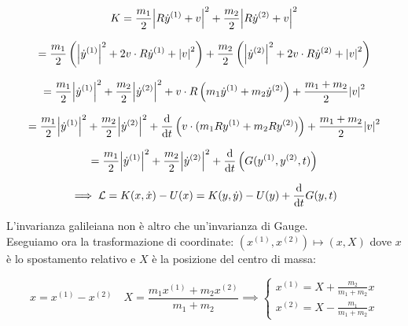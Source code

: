 \begin{equation*}
    K = \frac{m_1}{2}\abs{R\dot{y}^{(1)}+v}^2+\frac{m_2}{2}\abs{R\dot{y}^{(2)}+v}^2
\end{equation*}

\begin{equation*}
    = \frac{m_1}{2}\left( \abs{\dot{y}^{(1)}}^2+2v\cdot R\dot{y}^{(1)}+\abs{v}^2 \right)
    + \frac{m_2}{2}\left( \abs{\dot{y}^{(2)}}^2+2v\cdot R\dot{y}^{(2)}+\abs{v}^2 \right)
\end{equation*}

\begin{equation*}
    = \frac{m_1}{2}\abs{\dot{y}^{(1)}}^2 + \frac{m_2}{2}\abs{\dot{y}^{(2)}}^2
    + v \cdot R \left( m_1\dot{y}^{(1)}+m_2\dot{y}^{(2)} \right)
    + \frac{m_1+m_2}{2}\abs{v}^2
\end{equation*}

\begin{equation*}
    = \frac{m_1}{2}\abs{\dot{y}^{(1)}}^2 + \frac{m_2}{2}\abs{\dot{y}^{(2)}}^2
    + \dv{t}\left( v\cdot(m_1Ry^{(1)}+m_2Ry^{(2)}) \right)
    + \frac{m_1+m_2}{2}\abs{v}^2
\end{equation*}

\begin{equation}
    = \frac{m_1}{2}\abs{\dot{y}^{(1)}}^2 + \frac{m_2}{2}\abs{\dot{y}^{(2)}}^2
    + \dv{t}\left( G(y^{(1)},y^{(2)},t) \right)
\end{equation}

\begin{equation}
    \implies \mathcal{L}=K(x,\dot{x})- U (x)= K(y,\dot{y})-U(y)  +\dv{t}G(y,t)
\end{equation}

L'invarianza galileiana non è altro che un'invarianza di Gauge.\\
Eseguiamo ora la trasformazione di coordinate: $(x^{(1)},x^{(2)})\mapsto(x, X)$
dove $x$ è lo spostamento relativo e $X$ è la posizione del centro di massa:

\begin{equation}
    x = x^{(1)}-x^{(2)}\quad X =\frac{m_1x^{(1)}+m_2x^{(2)}}{m_1+m_2}\implies
    \begin{cases}
        x^{(1)}= X + \frac{m_2}{m_1+m_2}x\\
        x^{(2)}= X - \frac{m_1}{m_1+m_2}x
    \end{cases}
\end{equation}


